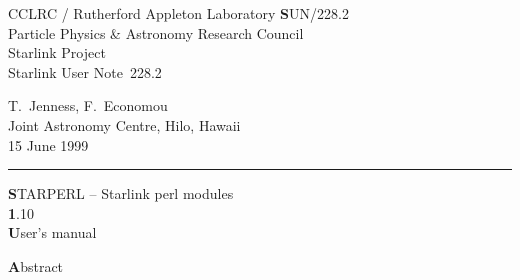 \documentclass[twoside,11pt]{article}
\newcommand{\stardoccategory}  {Starlink User Note}
\newcommand{\stardocinitials}  {SUN}
\newcommand{\stardocnumber}    {228.2}
\newcommand{\stardocauthors}   {T.\ Jenness, F.\ Economou\\
                                Joint Astronomy Centre, Hilo, Hawaii}
\newcommand{\stardocdate}      {15 June 1999}
\newcommand{\stardoctitle}     {STARPERL -- Starlink perl modules}
\newcommand{\stardocversion}   {1.10}
\newcommand{\stardocmanual}    {User's manual}
\newcommand{\stardocname}{\stardocinitials /\stardocnumber}
\newenvironment{latexonly}{}{}
\renewcommand{\_}{\texttt{\symbol{95}}}
\begin{document}
\thispagestyle{empty}

\begin{latexonly}
   CCLRC / {\textsc Rutherford Appleton Laboratory} \hfill {\textbf \stardocname}\\
   {\large Particle Physics \& Astronomy Research Council}\\
   {\large Starlink Project\\}
   {\large \stardoccategory\ \stardocnumber}
   \begin{flushright}
   \stardocauthors\\
   \stardocdate
   \end{flushright}
   \vspace{-4mm}
   \rule{\textwidth}{0.5mm}
   \vspace{5mm}
   \begin{center}
   {\Huge\textbf  \stardoctitle \\ [2.5ex]}
   {\LARGE\textbf \stardocversion \\ [4ex]}
   {\Huge\textbf  \stardocmanual}
   \end{center}
   \vspace{5mm}


   \vspace{10mm}
   \begin{center}
      {\Large\textbf Abstract}
   \end{center}
\end{latexonly}
\end{document}
